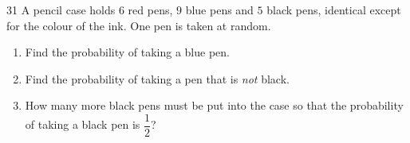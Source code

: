 \clearpage
{}

\begin{probbox}{31}{\relax}
A pencil case holds $6$ red pens, $9$ blue pens and $5$ black pens, identical except for the colour of the ink. One pen is taken at random.
\begin{enumerate}[label=\alph*),leftmargin=1.5em,itemsep=0pt,topsep=2pt]
\item Find the probability of taking a blue pen.
\item Find the probability of taking a pen that is \emph{not} black.
\item How many more black pens must be put into the case so that the probability of taking a black pen is $\dfrac12$?
\end{enumerate}
\end{probbox}
